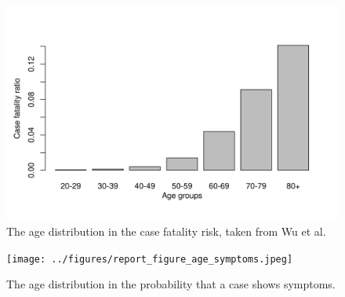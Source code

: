 \documentclass[11pt]{article}
\begin{document}
\begin{figure}[hb!]
\centering
\includegraphics[width=\textwidth]{../figures/report_figure_age_CFR.jpeg} 
\caption{\label{fig_age_cfr} The age distribution in the case fatality risk, taken from Wu et al.}
\end{figure}

\begin{figure}[hb!]
\centering
\texttt{[image: ../figures/report\_figure\_age\_symptoms.jpeg]} 
\caption{\label{fig_age_symp} The age distribution in the probability that a case shows symptoms.}
\end{figure}
\end{document}
